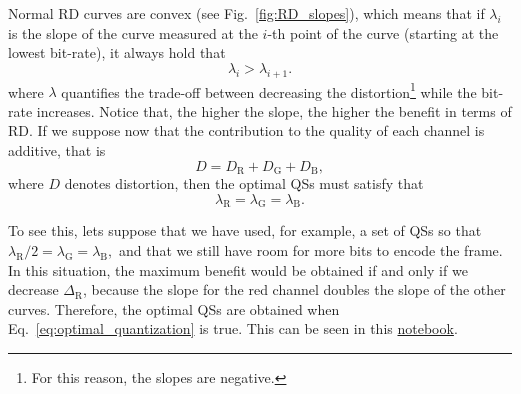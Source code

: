 Normal RD curves are convex (see Fig.~\ref{fig:RD_slopes}), which
means that if $\lambda_i$ is the slope of the curve measured at the
$i$-th point of the curve (starting at the lowest bit-rate), it always
hold that
\begin{equation}
  \lambda_i > \lambda_{i+1}.
\end{equation}
where $\lambda$ quantifies the trade-off between decreasing the
distortion\footnote{For this reason, the slopes are negative.} while
the bit-rate increases. Notice that, the higher the slope, the higher
the benefit in terms of RD. If we suppose now that the contribution to
the quality of each channel is additive, that is
\begin{equation}
  D = D_{\text{R}} + D_{\text{G}} + D_{\text{B}},
\end{equation}
where $D$ denotes distortion, then the optimal QSs must satisfy
that~\cite{vetterli1995wavelets,sayood2017introduction}
\begin{equation}
  \lambda_{\text{R}} = \lambda_{\text{G}} = \lambda_{\text{B}}.
  \label{eq:optimal_quantization}
\end{equation}

To see this, lets suppose that we have used, for example, a set of QSs
so that $\lambda_{\text{R}}/2 = \lambda_{\text{G}} =
\lambda_{\text{B}},$ and that we still have room for more bits to
encode the frame. In this situation, the maximum benefit would be
obtained if and only if we decrease $\Delta_{\text{R}}$, because the
slope for the red channel doubles the slope of the other
curves. Therefore, the optimal QSs are obtained when
Eq.~\ref{eq:optimal_quantization} is true. This can be seen in this
\href{https://github.com/Sistemas-Multimedia/Sistemas-Multimedia.github.io/blob/master/milestones/05-RGB_quantization/RGB_quantization.ipynb}{notebook}.

\begin{comment}
Thus, the optimal QSs should
operate in the curves with the same RD slope,
\begin{equation}
  \lambda_{\text{R}} = \lambda_{\text{G}} = \lambda_{\text{B}},
  \label{eq:optimal_quantization}
\end{equation}
for a given total bit-rate $R$, which implies that the contribution of each channel (the ratio between
quality and bit-rate) to the quality of $\tilde{x}$ has been highest
possible~\cite{vetterli1995wavelets,sayood2017introduction}.

Unfortunately, the previous procedure implies the computation of the
RD curve for each channel, which is a time-consuming operation. For
this reason, and supposing that the statistics of each channel are
similar and therefore, each channel is going to generate a RD curve
with the same slopes for the same QSs, we can suppose that
Eq.~\ref{eq:simple_Q} satisfies Eq.~\ref{eq:optimal_quantization}.
\end{comment}

